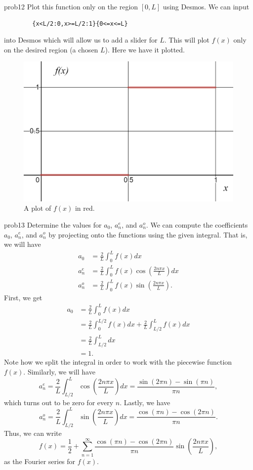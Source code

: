 \documentclass{article}
\begin{document}
\begin{solution}{}{prob12}
		Plot this function only on the region $[0,L]$ using Desmos.
		\tcblower
		We can input
		\begin{verbatim}
		{x<L/2:0,x>=L/2:1}{0<=x<=L}
		\end{verbatim}
		into Desmos which will allow us to add a slider for $L$. This will plot $f(x)$ only on the desired region (a chosen $L$). Here we have it plotted.
		\begin{figure}[H]
			\centering
			\includegraphics[width=.6\textwidth]{f_function.png}
			\caption{A plot of $f(x)$ in red.}
		\end{figure}
	\end{solution}

\begin{solution}{}{prob13}
		Determine the values for $a_0$, $a_n^e$, and $a_n^o$.
		\tcblower
		We can compute the coefficients $a_0$, $a_n^e$, and $a_n^o$ by projecting onto the functions using the given integral. That is, we will have
		\begin{align*}
			a_0 &= \frac{2}{L}\int_0^L f(x) dx\\
			a_n^e &= \frac{2}{L} \int_0^L f(x) \cos\left(\frac{2n\pi x}{L}\right)dx\\
			a_n^o&= \frac{2}{L}\int_0^L f(x) \sin\left(\frac{2n\pi x}{L}\right).
		\end{align*}
		First, we get
		\begin{align*}
		a_0 &= \frac{2}{L} \int_0^L f(x)dx \\
		&= \frac{2}{L} \int_0^{L/2} f(x)dx + \frac{2}{L}\int_{L/2}^L f(x)dx\\
		&= \frac{2}{L}\int_{L/2}^L dx\\
		&= 1.
		\end{align*}
		Note how we split the integral in order to work with the piecewise function $f(x)$.  Similarly, we will have
		\[
		a_n^e = \frac{2}{L} \int_{L/2}^L \cos\left(\frac{2n\pi x}{L}\right)dx = \frac{\sin(2\pi n)-\sin(\pi n)}{\pi n},
		\]
		which turns out to be zero for every $n$. Lastly, we have
		\[
		a_n^o = \frac{2}{L} \int_{L/2}^L \sin\left(\frac{2n\pi x}{L}\right)dx = \frac{\cos(\pi n)-\cos(2\pi n)}{\pi n}.
		\]
		Thus, we can write 
		\[
		f(x)=\frac{1}{2} + \sum_{n=1}^\infty \frac{\cos(\pi n)-\cos(2\pi n)}{\pi n}\sin\left(\frac{2n \pi x}{L}\right),
		\]
		as the Fourier series for $f(x)$.
	\end{solution}
\end{document}
